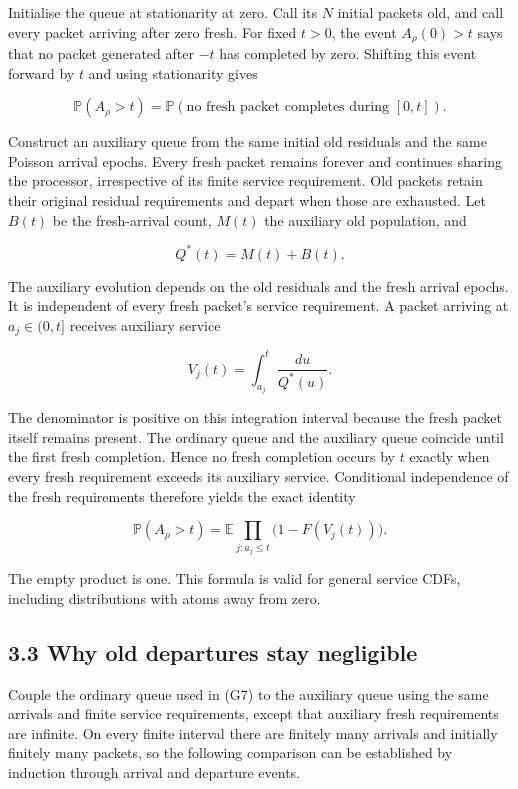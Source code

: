 \documentclass[
  11pt,
  a4paper,
]{scrartcl}
\begin{document}
Initialise the queue at stationarity at zero. Call its \(N\) initial
packets old, and call every packet arriving after zero fresh. For fixed
\(t>0\), the event \(A_\rho(0)>t\) says that no packet generated after
\(-t\) has completed by zero. Shifting this event forward by \(t\) and
using stationarity gives

\[
\mathbb P(A_\rho>t)
=\mathbb P(\text{no fresh packet completes during }[0,t]).
\tag{G8}
\]

Construct an auxiliary queue from the same initial old residuals and the
same Poisson arrival epochs. Every fresh packet remains forever and
continues sharing the processor, irrespective of its finite service
requirement. Old packets retain their original residual requirements and
depart when those are exhausted. Let \(B(t)\) be the fresh-arrival
count, \(M(t)\) the auxiliary old population, and

\[
Q^*(t)=M(t)+B(t).
\]

The auxiliary evolution depends on the old residuals and the fresh
arrival epochs. It is independent of every fresh packet's service
requirement. A packet arriving at \(a_j\in(0,t]\) receives auxiliary
service

\[
V_j(t)=\int_{a_j}^t\frac{du}{Q^*(u)}.
\tag{G9}
\]

The denominator is positive on this integration interval because the
fresh packet itself remains present. The ordinary queue and the
auxiliary queue coincide until the first fresh completion. Hence no
fresh completion occurs by \(t\) exactly when every fresh requirement
exceeds its auxiliary service. Conditional independence of the fresh
requirements therefore yields the exact identity

\[
\mathbb P(A_\rho>t)
=\mathbb E\prod_{j:a_j\leq t}\bigl(1-F(V_j(t))\bigr).
\tag{G10}
\]

The empty product is one. This formula is valid for general service
CDFs, including distributions with atoms away from zero.

\subsection{3.3 Why old departures stay
negligible}\label{why-old-departures-stay-negligible}

Couple the ordinary queue used in (G7) to the auxiliary queue using the
same arrivals and finite service requirements, except that auxiliary
fresh requirements are infinite. On every finite interval there are
finitely many arrivals and initially finitely many packets, so the
following comparison can be established by induction through arrival and
departure events.
\end{document}
